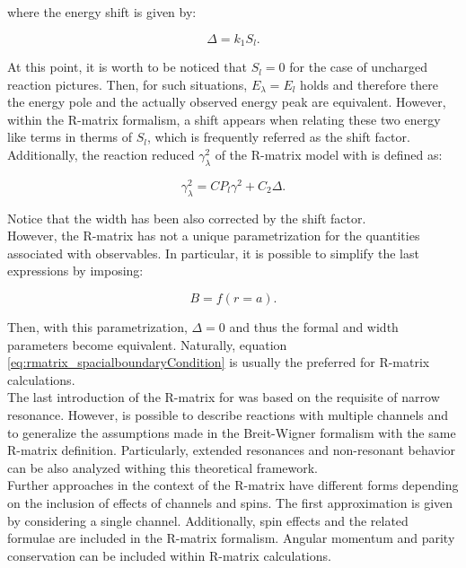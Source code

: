 \documentclass[openany]{book}
\begin{document}
where the energy shift is given by: 

\begin{equation}  \label{eq:rmatrix_energyShift}
	\Delta = k_1 S_l.
\end{equation}

At this point, it is worth to be noticed that $S_l = 0$ for the case of uncharged reaction pictures. Then, for such situations, $E_\lambda = E_l$ holds and therefore there the energy pole and the actually observed energy peak are equivalent. However, within the R-matrix formalism, a shift appears when relating these two energy like terms in therms of $S_l$, which is frequently referred as the shift factor. \\

Additionally, the reaction reduced $\gamma^2_\lambda$ of the R-matrix model  with is defined as:

\begin{equation}   \label{eq:rmatrix_reducedWidth_formal}
	\gamma^2_\lambda =C P_l\gamma^2 + C_2 \Delta.
\end{equation}

Notice that the width has been also corrected by the shift factor. \\

However, the R-matrix has not a unique parametrization for the quantities associated with observables. In particular, it is possible to simplify the last expressions by imposing: 

\begin{equation}  \label{eq:rmatrix_spacialboundaryCondition}
	B = f(r = a). 
\end{equation}

Then, with this parametrization, $\Delta = 0$ and thus the formal and width parameters become equivalent. Naturally, equation \ref{eq:rmatrix_spacialboundaryCondition} is usually  the preferred for R-matrix calculations. \\

The last introduction of the R-matrix for was based on the requisite of narrow resonance. However,  is possible to describe reactions with multiple channels and to generalize the assumptions made in the Breit-Wigner formalism with the same R-matrix definition. Particularly, extended resonances and non-resonant behavior can be also analyzed withing this theoretical framework.\\

Further approaches in the context of the R-matrix have different forms depending on the inclusion of effects of channels and spins. The first approximation is given by considering a single channel. Additionally, spin effects and the related formulae are included in the R-matrix formalism. Angular momentum and parity conservation can be included within R-matrix calculations. \\
\end{document}
